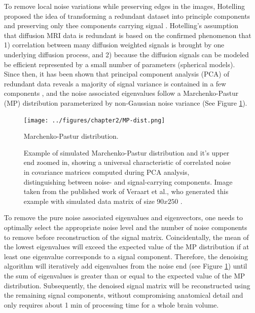 To remove local noise variations while preserving edges in the images, Hotelling proposed the idea of transforming a redundant dataset into principle components and preserving only thee components carrying signal \cite{hotelling1933analysis}. Hotelling's assumption that diffusion MRI data is redundant is based on the confirmed phenomenon that 1) correlation between many diffusion weighted signals is brought by one underlying diffusion process, and 2) because the diffusion signals can be modeled be efficient represented by a small number of parameters (spherical models). Since then, it has been shown that principal component analysis (PCA) of redundant data reveals a majority of signal variance is contained in a few components \cite{deledalle2011image,manjon_mri_2015} , and the noise associated eigenvalues follow a Marchenko-Pastur (MP) distribution parameterized by non-Gaussian noise variance \cite{marchenko1967distribution} (See Figure \ref{fig:mp_dist}). 

\begin{figure}[htbp]
    \centering
    \texttt{[image: ../figures/chapter2/MP-dist.png]}
    \caption{Marchenko-Pastur distribution.}
    \caption*{Example of simulated Marchenko-Pastur distribution and it's upper end zoomed in, showing a universal characteristic of correlated noise in covariance matrices computed during PCA analysis, distinguishing between noise- and signal-carrying components. Image taken from the published work of Veraart et al., who generated this example with simulated data matrix of size $90x250$ \cite{veraart_denoising_2016}.}
    \label{fig:mp_dist}
\end{figure}

To remove the pure noise associated eigenvalues and eigenvectors, one needs to optimally select the appropriate noise level and the number of noise components to remove before reconstruction of the signal matrix. Coincidentally, the mean of the lowest eigenvalues will exceed the expected value of the MP distribution if at least one eigenvalue corresponds to a signal component. Therefore, the denoising algorithm will iteratively add eigenvalues from the noise end (see Figure \ref{fig:mp_dist}) until the sum of eigenvalues is greater than or equal to the expected value of the MP distribution. Subsequently, the denoised signal matrix will be reconstructed using the remaining signal components, without compromising anatomical detail and only requires about 1 min of processing time for a whole brain volume.

